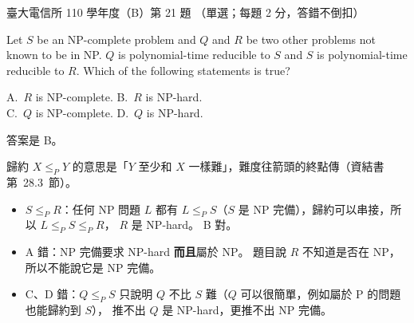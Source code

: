 \begin{pastexam}[label={px:ntu-110-comm-dsa-21}]{臺大電信所 110 學年度（B）第 21 題}
（單選；每題 2 分，答錯不倒扣）

Let $S$ be an NP-complete problem and $Q$ and $R$ be two other problems not known to be in NP. $Q$ is polynomial-time reducible to $S$ and $S$ is polynomial-time reducible to $R$. Which of the following statements is true?

A.~$R$ is NP-complete. \qquad B.~$R$ is NP-hard.\\
C.~$Q$ is NP-complete. \qquad D.~$Q$ is NP-hard.
\end{pastexam}

\begin{pastsoln}
答案是 B。

歸約 $X \le_P Y$ 的意思是「$Y$ 至少和 $X$ 一樣難」，難度往箭頭的終點傳（資結書第~28.3~節）。
\begin{itemize}
\item $S \le_P R$：任何 NP 問題 $L$ 都有 $L \le_P S$（$S$ 是 NP 完備），歸約可以串接，所以 $L \le_P S \le_P R$，
$R$ 是 NP-hard。 B 對。
\item A 錯：NP 完備要求 NP-hard \textbf{而且}屬於 NP。 題目說 $R$ 不知道是否在 NP，所以不能說它是 NP 完備。
\item C、D 錯：$Q \le_P S$ 只說明 $Q$ 不比 $S$ 難（$Q$ 可以很簡單，例如屬於 P 的問題也能歸約到 $S$），
推不出 $Q$ 是 NP-hard，更推不出 NP 完備。
\end{itemize}
\end{pastsoln}
